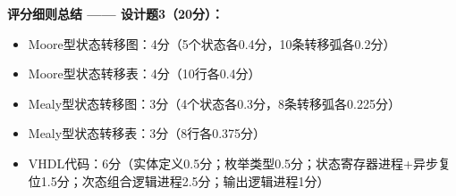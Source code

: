 \vspace{0.5cm}
\begin{framed}
\textbf{评分细则总结 —— 设计题3（20分）：}
\begin{itemize}
\item Moore型状态转移图：4分（5个状态各0.4分，10条转移弧各0.2分）
\item Moore型状态转移表：4分（10行各0.4分）
\item Mealy型状态转移图：3分（4个状态各0.3分，8条转移弧各0.225分）
\item Mealy型状态转移表：3分（8行各0.375分）
\item VHDL代码：6分（实体定义0.5分；枚举类型0.5分；状态寄存器进程+异步复位1.5分；次态组合逻辑进程2.5分；输出逻辑进程1分）
\end{itemize}
\end{framed}

\endinput
